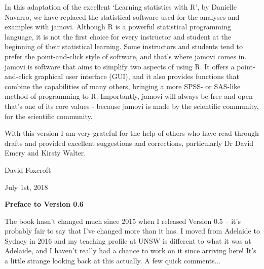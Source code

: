 \noindent
In this adaptation of the excellent `Learning statistics with R', by Danielle Navarro, we have replaced the statistical software used for the analyses and examples with jamovi. Although R is a powerful statistical programming language, it is not the first choice for every instructor and student at the beginning of their statistical learning. Some instructors and students tend to prefer the point-and-click style of software, and that's where jamovi comes in. jamovi is software that aims to simplify two aspects of using R. It offers a point-and-click graphical user interface (GUI), and it also provides functions that combine the capabilities of many others, bringing a more SPSS- or SAS-like method of programming to R. Importantly, jamovi will always be free and open - that's one of its core values - because jamovi is made by the scientific community, for the scientific community.

With this version I am very grateful for the help of others who have read through drafts and provided excellent suggestions and corrections, particularly Dr David Emery and Kirsty Walter.

\vspace*{24pt}
\noindent
David Foxcroft 

\noindent
July 1st, 2018

\vspace*{35pt}


\begin{center}{\Large {\bf Preface to Version 0.6}}\end{center}
\vspace*{12pt}

\noindent
The book hasn't changed much since 2015 when I released Version 0.5 -- it's probably fair to say that I've changed more than it has. I moved from Adelaide to Sydney in 2016 and my teaching profile at UNSW is different to what it was at Adelaide, and I haven't really had a chance to work on it since arriving here! It's a little strange looking back at this actually. A few quick comments...

